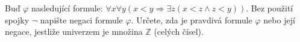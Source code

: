 \subsubsection{}
Buď $\varphi$ nasledující formule: $\forall x \forall y (x < y \Rightarrow
\exists z (x<z\wedge z<y))$. Bez použití
spojky $\neg$ napište negaci formule $\varphi$. Určete, zda je pravdivá formule
$\varphi$ nebo její
negace, jestliže univerzem je množina $\mathbb{Z}$ (celých čísel).
